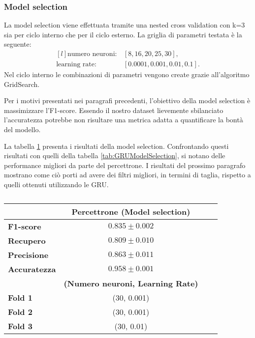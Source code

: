 \documentclass[../../main.tex]{subfiles}
\begin{document}
    \subsubsection{Model selection}

    La model selection viene effettuata tramite una nested cross validation con k=3 sia per ciclo interno che per il ciclo esterno. La griglia di parametri testata è la seguente:
    \[
    \begin{matrix*}[l]
        \text{numero neuroni}: & [8, 16, 20, 25, 30],\\
        \text{learning rate}: & [0.0001, 0.001, 0.01, 0.1].
    \end{matrix*}
    \]
    Nel ciclo interno le combinazioni di parametri vengono create grazie all'algoritmo GridSearch.

    Per i motivi presentati nei paragrafi precedenti, l'obiettivo della model selection è massimizzare l'F1-score. Essendo il nostro dataset lievemente sbilanciato l'accuratezza potrebbe non risultare una metrica adatta a quantificare la bontà del modello.
    

    La tabella \ref{tab:modelSelection} presenta i risultati della model selection. Confrontando questi risultati con quelli della tabella \ref{tab:GRUModelSelection}, si notano delle performance migliori da parte del percettrone. I risultati del prossimo paragrafo mostrano come ciò porti ad avere dei filtri migliori, in termini di taglia, rispetto a quelli ottenuti utilizzando le GRU.
    \begin{table}[H]
        \centering                  
        \begin{tabular}{lccc}
            \toprule
            {}  &   \textbf{Percettrone (Model selection)}\\
            \midrule
            \textbf{F1-score }      &    $0.835 \pm 0.002$ \\
            \textbf{Recupero   }    &    $0.809 \pm 0.010$ \\
            \textbf{Precisione }    &    $0.863 \pm 0.011$ \\
            \textbf{Accuratezza }   &    $0.958 \pm 0.001$ \\
            \midrule
            {} & \textbf{(Numero neuroni, Learning Rate)}\\
            \midrule
            \textbf{Fold 1} &   (30, 0.001)\\ 
            \textbf{Fold 2} &   (30, 0.001)\\
            \textbf{Fold 3} &   (30, 0.01)\\
            \bottomrule
        \end{tabular}
        \caption{}
        \label{tab:modelSelection}
    \end{table}


    
\end{document}
